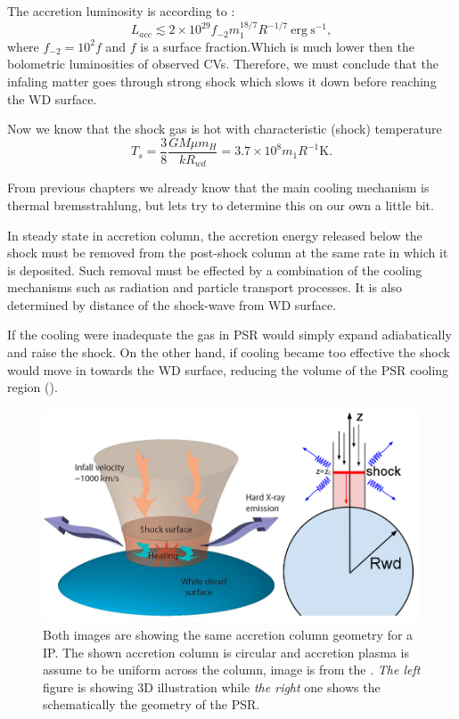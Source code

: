 \documentclass[oneside,a4paper,11pt]{report}
\begin{document}
The accretion luminosity is according to \citet{accpower:1}:
\begin{equation}
\label{lacc}
L_{acc} \lesssim 2 \times 10^{29}f_{-2}m_1^{18/7}R^{-1/7} \: \mathrm{erg \: s^{-1}},
\end{equation}
where $f_{-2} = 10^2 f$ and $f$ is a surface fraction.Which is much lower then the bolometric luminosities 
of observed CVs. Therefore, we must conclude that the infaling matter goes through strong shock which 
slows it down before reaching the WD surface.    

Now we know that the shock gas is hot with characteristic (shock) temperature
\begin{equation}
\label{br_ts}
 T_s = \frac{3}{8}\frac{G M \mu m_H}{k R_{wd}}=3.7 \times 10^8 m_1 R^{-1} \mathrm{K}. 
\end{equation}

From previous chapters we already know that the main cooling mechanism is thermal bremsstrahlung, but 
lets try to determine this on our own a little bit. 

In steady state in accretion column, the accretion energy released below the shock must be removed 
from the post-shock column at the same rate in which it is deposited. Such removal must be effected 
by a combination of the cooling mechanisms such as radiation and particle transport processes. It is also 
determined by distance of the shock-wave from WD surface. 

If the cooling were inadequate the gas in PSR would simply expand adiabatically and raise 
the shock. On the other hand, if cooling became too effective the shock would move in towards the 
WD surface, reducing the volume of the PSR cooling region (\citet{accpower:1}).  

\begin{figure}[hbt]
\centering
\includegraphics[totalheight=5cm]{plot/psr2}
\caption{Both images are showing the same accretion column geometry for a IP. The shown accretion column 
is circular and accretion plasma is assume to be uniform across the column, image is from the \citet{krivonos_pres}. 
\textit{The left} figure is showing
3D illustration while \textit{the right} one shows the schematically the geometry of the PSR.}
\label{psr1} 
\end{figure}
\end{document}
